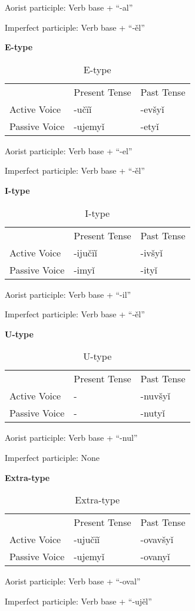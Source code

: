 Aorist participle: Verb base + “-al”

Imperfect participle: Verb base + “-ěl”

\textbf{E-type}

\begin{table}[!htb]
	\caption{E-type}
	\begin{tabular}{lll}
		& Present Tense & Past Tense \\
		Active Voice & -učïǐ & -evšyǐ \\
		Passive Voice & -ujemyǐ & -etyǐ
	\end{tabular}
\end{table}

Aorist participle: Verb base + “-el”

Imperfect participle: Verb base + “-ěl”

\textbf{I-type}

\begin{table}[!htb]
	\caption{I-type}
	\begin{tabular}{lll}
		& Present Tense & Past Tense \\
		Active Voice & -ijučïǐ & -ivšyǐ \\
		Passive Voice & -imyǐ & -ityǐ
	\end{tabular}
\end{table}

Aorist participle: Verb base + “-il”

Imperfect participle: Verb base + “-ěl”

\textbf{U-type}

\begin{table}[!htb]
	\caption{U-type}
	\begin{tabular}{lll}
		& Present Tense & Past Tense \\
		Active Voice & - & -nuvšyǐ \\
		Passive Voice & - & -nutyǐ
	\end{tabular}
\end{table}

Aorist participle: Verb base + “-nul”

Imperfect participle: None

\textbf{Extra-type }

\begin{table}[!htb]
	\caption{Extra-type}
	\begin{tabular}{lll}
		& Present Tense & Past Tense \\
		Active Voice & -ujučïǐ & -ovavšyǐ \\
		Passive Voice & -ujemyǐ & -ovanyǐ
	\end{tabular}
\end{table}

Aorist participle: Verb base + “-oval”

Imperfect participle: Verb base + “-ujěl”
